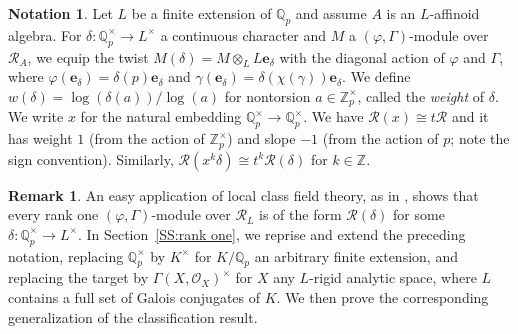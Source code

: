 \documentclass[12pt]{article}
\theoremstyle{definition}
\newtheorem{remark}[theorem]{Remark}
\newtheorem{notation}[theorem]{Notation}
\numberwithin{equation}{theorem}
\newcommand{\calO}{\mathcal{O}}
\newcommand{\calR}{\mathcal{R}}
\newcommand{\QQ}{\mathbb{Q}}
\newcommand{\ZZ}{\mathbb{Z}}
\newcommand{\bbe}{\mathbf{e}}
\def\Qp{\QQ_p}
\newcommand{\Zp}{\ZZ_p}
\begin{document}
\begin{notation}\label{N:char type over Qp}
Let $L$ be a finite extension of $\Qp$ and assume $A$ is an
$L$-affinoid algebra.  For $\delta: \Qp^\times \to L^\times$ a
continuous character and $M$ a $(\varphi,\Gamma)$-module over
$\calR_A$, we equip the twist $M(\delta) = M \otimes_L L\bbe_\delta$
with the diagonal action of $\varphi$ and $\Gamma$, where
$\varphi(\bbe_\delta) = \delta(p)\bbe_\delta$ and $\gamma(\bbe_\delta)
= \delta(\chi(\gamma))\bbe_\delta$.  We define $w(\delta) =
\log(\delta(a)) / \log(a)$ for nontorsion $a \in \Zp^\times$, called
the \emph{weight} of $\delta$.  We write $x$ for the natural embedding
$\Qp^\times \to \Qp^\times$.  We have $\calR(x) \cong t\calR$ and it
has weight $1$ (from the action of $\Zp^\times$) and slope $-1$ (from
the action of $p$; note the sign convention).  Similarly,
$\calR(x^k\delta) \cong t^k\calR(\delta)$ for $k \in \ZZ$.
\end{notation}

\begin{remark}
An easy application of local class field theory, as in
\cite[Proposition~3.1]{colmez}, shows that every rank one
$(\varphi,\Gamma)$-module over $\calR_L$ is of the form
$\calR(\delta)$ for some $\delta : \Qp^\times \to L^\times$.  In
Section~\ref{SS:rank one}, we reprise and extend the preceding
notation, replacing $\Qp^\times$ by $K^\times$ for $K/\Qp$ an
arbitrary finite extension, and replacing the target by
$\Gamma(X,\calO_X)^\times$ for $X$ any $L$-rigid analytic space, where
$L$ contains a full set of Galois conjugates of $K$.  We then prove
the corresponding generalization of the classification result.
\end{remark}
\end{document}
